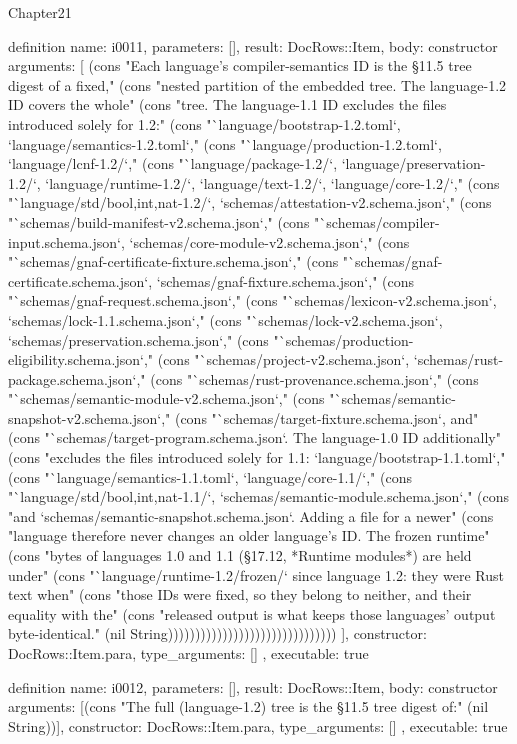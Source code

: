 \begin{lexlean}{Chapter21}
\begin{semanticmodule}
definition{
  name: i0011,
  parameters: [],
  result: DocRows::Item,
  body: constructor{
    arguments: [
      (cons "Each language's compiler-semantics ID is the §11.5 tree digest of a fixed," (cons "nested partition of the embedded tree. The language-1.2 ID covers the whole" (cons "tree. The language-1.1 ID excludes the files introduced solely for 1.2:" (cons "`language/bootstrap-1.2.toml`, `language/semantics-1.2.toml`," (cons "`language/production-1.2.toml`, `language/lcnf-1.2/`," (cons "`language/package-1.2/`, `language/preservation-1.2/`, `language/runtime-1.2/`, `language/text-1.2/`, `language/core-1.2/`," (cons "`language/std/{bool,int,nat}-1.2/`, `schemas/attestation-v2.schema.json`," (cons "`schemas/build-manifest-v2.schema.json`," (cons "`schemas/compiler-input.schema.json`, `schemas/core-module-v2.schema.json`," (cons "`schemas/gnaf-certificate-fixture.schema.json`," (cons "`schemas/gnaf-certificate.schema.json`, `schemas/gnaf-fixture.schema.json`," (cons "`schemas/gnaf-request.schema.json`," (cons "`schemas/lexicon-v2.schema.json`, `schemas/lock-1.1.schema.json`," (cons "`schemas/lock-v2.schema.json`, `schemas/preservation.schema.json`," (cons "`schemas/production-eligibility.schema.json`," (cons "`schemas/project-v2.schema.json`, `schemas/rust-package.schema.json`," (cons "`schemas/rust-provenance.schema.json`," (cons "`schemas/semantic-module-v2.schema.json`," (cons "`schemas/semantic-snapshot-v2.schema.json`," (cons "`schemas/target-fixture.schema.json`, and" (cons "`schemas/target-program.schema.json`. The language-1.0 ID additionally" (cons "excludes the files introduced solely for 1.1: `language/bootstrap-1.1.toml`," (cons "`language/semantics-1.1.toml`, `language/core-1.1/`," (cons "`language/std/{bool,int,nat}-1.1/`, `schemas/semantic-module.schema.json`," (cons "and `schemas/semantic-snapshot.schema.json`. Adding a file for a newer" (cons "language therefore never changes an older language's ID. The frozen runtime" (cons "bytes of languages 1.0 and 1.1 (§17.12, *Runtime modules*) are held under" (cons "`language/runtime-1.2/frozen/` since language 1.2: they were Rust text when" (cons "those IDs were fixed, so they belong to neither, and their equality with the" (cons "released output is what keeps those languages' output byte-identical." (nil String)))))))))))))))))))))))))))))))
    ],
    constructor: DocRows::Item.para,
    type_arguments: []
  },
  executable: true
}

definition{
  name: i0012,
  parameters: [],
  result: DocRows::Item,
  body: constructor{
    arguments: [(cons "The full (language-1.2) tree is the §11.5 tree digest of:" (nil String))],
    constructor: DocRows::Item.para,
    type_arguments: []
  },
  executable: true
}


\end{semanticmodule}
\end{lexlean}
